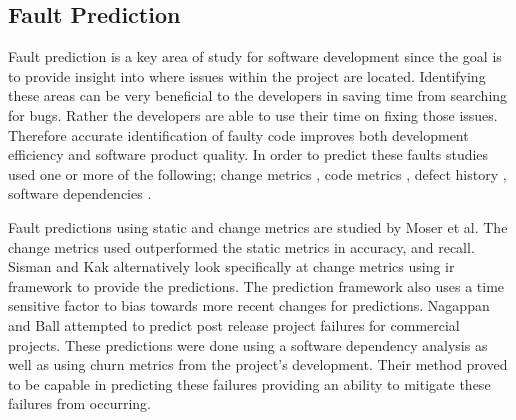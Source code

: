 \subsection{Fault Prediction}

Fault prediction is a key area of study for software development since the goal is to provide insight into where issues within the project are located. Identifying these areas can be very beneficial to the developers in saving time from searching for bugs. Rather the developers are able to use their time on fixing those issues. Therefore accurate identification of faulty code improves both development efficiency and software product quality. In order to predict these faults studies used one or more of the following; change metrics \cite{Moser2008, Sisman2012, Nagappan2007}, code metrics \cite{Moser2008, Thwin2005}, defect history \cite{Sisman2012}, software dependencies \cite{Nagappan2007}.

Fault predictions using static and change metrics are studied by Moser et al. The change metrics used outperformed the static metrics in accuracy, and recall. Sisman and Kak alternatively look specifically at change metrics using \gls{ir} framework to provide the predictions. The prediction framework also uses a time sensitive factor to bias towards more recent changes for predictions. Nagappan and Ball attempted to predict post release project failures for commercial projects. These predictions were done using a software dependency analysis as well as using churn metrics from the project's development. Their method proved to be capable in predicting these failures providing an ability to mitigate these failures from occurring.





